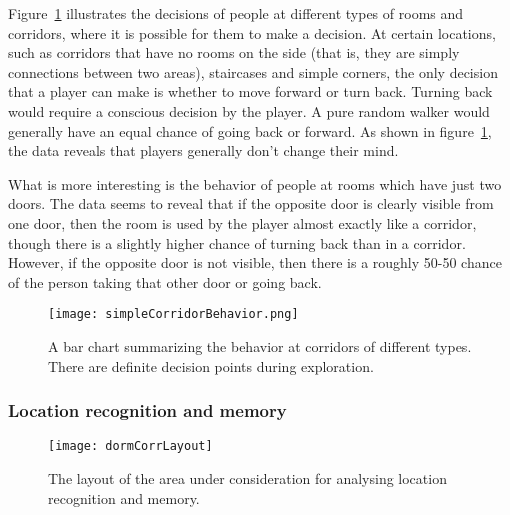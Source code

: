 Figure~\ref{fig:simpleCorridorBehavior} illustrates the decisions of people at different types of rooms and corridors, where it is possible for them to make a decision. At certain locations, such as corridors that have no rooms on the side (that is, they are simply connections between two areas), staircases and simple corners, the only decision that a player can make is whether to move forward or turn back. Turning back would require a conscious decision by the player. A pure random walker would generally have an equal chance of going back or forward. As shown in figure~\ref{fig:simpleCorridorBehavior}, the data reveals that players generally don't change their mind.

What is more interesting is the behavior of people at rooms which have just two doors. The data seems to reveal that if the opposite door is clearly visible from one door, then the room is used by the player almost exactly like a corridor, though there is a slightly higher chance of turning back than in a corridor. However, if the opposite door is not visible, then there is a roughly 50-50 chance of the person taking that other door or going back.

\begin{figure}[tb]
    \begin{center}
        \texttt{[image: simpleCorridorBehavior.png]}
    \end{center}
    \caption{A bar chart summarizing the behavior at corridors of different types. There are definite decision points during exploration.}
    \label{fig:simpleCorridorBehavior}
\end{figure}

\subsubsection{Location recognition and memory} %
\label{sec:on_memory_and_exploration}

\begin{figure}[tb]
    \begin{center}
        \texttt{[image: dormCorrLayout]}
    \end{center}
    \caption{The layout of the area under consideration for analysing location recognition and memory.}
    \label{fig:dormCorrLayout}
\end{figure}

